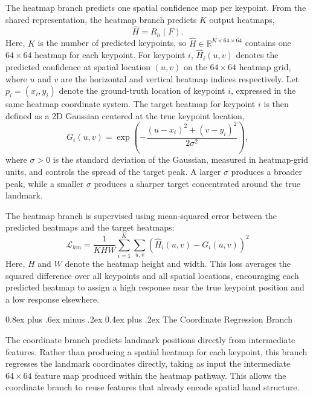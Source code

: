 ﻿\documentclass[10pt,letterpaper]{article}
\makeatletter
\renewcommand\subsubsection{\@startsection{subsubsection}{3}{\z@}%
  {0.8ex plus .6ex minus .2ex}%
  {0.4ex plus .2ex}%
  {\normalfont\small\itshape}}
\makeatother
\begin{document}
\noindent
The heatmap branch predicts one spatial confidence map per keypoint. From the shared representation, the heatmap branch predicts \(K\) output heatmaps,
\begin{equation}
\hat{H} = R_h(F).
\label{eq:heatmap-output}
\end{equation}
Here, \(K\) is the number of predicted keypoints, so \(\hat{H} \in \mathbb{R}^{K \times 64 \times 64}\) contains one \(64 \times 64\) heatmap for each keypoint. For keypoint \(i\), \(\hat{H}_i(u,v)\) denotes the predicted confidence at spatial location \((u,v)\) on the \(64 \times 64\) heatmap grid, where \(u\) and \(v\) are the horizontal and vertical heatmap indices respectively. Let \(p_i = (x_i, y_i)\) denote the ground-truth location of keypoint \(i\), expressed in the same heatmap coordinate system. The target heatmap for keypoint \(i\) is then defined as a 2D Gaussian centered at the true keypoint location,
\begin{equation}
G_i(u,v) = \exp\left(
-\frac{(u-x_i)^2 + (v-y_i)^2}{2\sigma^2}
\right),
\label{eq:gaussian-target}
\end{equation}
where \(\sigma > 0\) is the standard deviation of the Gaussian, measured in heatmap-grid units, and controls the spread of the target peak. A larger \(\sigma\) produces a broader peak, while a smaller \(\sigma\) produces a sharper target concentrated around the true landmark.

The heatmap branch is supervised using mean-squared error between the predicted heatmaps and the target heatmaps:
\begin{equation}
\mathcal{L}_{hm}
=
\frac{1}{KHW}
\sum_{i=1}^{K}
\sum_{u,v}
\left(\hat{H}_i(u,v) - G_i(u,v)\right)^2
\label{eq:heatmap-loss}
\end{equation}
Here, \(H\) and \(W\) denote the heatmap height and width. This loss averages the squared difference over all keypoints and all spatial locations, encouraging each predicted heatmap to assign a high response near the true keypoint position and a low response elsewhere. 

\subsubsection{The Coordinate Regression Branch}

\noindent
The coordinate branch predicts landmark positions directly from intermediate features. Rather than producing a spatial heatmap for each keypoint, this branch regresses the landmark coordinates directly, taking as input the intermediate \(64 \times 64\) feature map produced within the heatmap pathway. This allows the coordinate branch to reuse features that already encode spatial hand structure.
\end{document}
